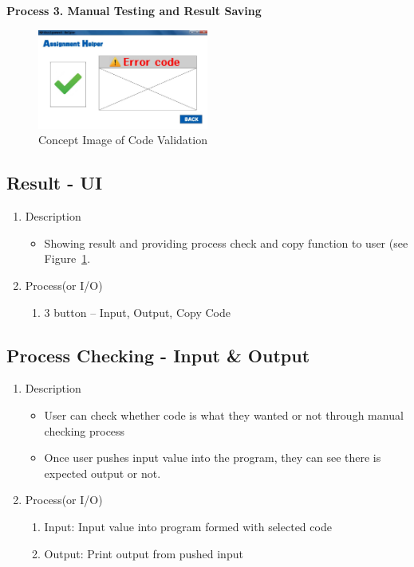 \documentclass[conference]{IEEEtran}
\begin{document}
\textbf{Process 3. Manual Testing and Result Saving}


\textit{}
\begin{figure}[h]
\centering
\includegraphics[width=0.5\textwidth]{./figures/UI_code_validation_fail.jpg}  
\caption{Concept Image of Code Validation}
\label{fig_concept_validation_manual}
\end{figure}


\subsection{Result - UI}
\begin{enumerate}
  \item Description
  \begin{itemize}
    \item Showing result and providing process check and copy function to user (see Figure~\ref{fig_concept_validation_manual}.
  \end{itemize}
  \item Process(or I/O)
  \begin{enumerate}
    \item 3 button – Input, Output, Copy Code
  \end{enumerate}
\end{enumerate}
\textit{}

\subsection{Process Checking - Input \& Output}
\begin{enumerate}
  \item Description
  \begin{itemize}
    \item User can check whether code is what they wanted or not through manual checking process
    \item Once user pushes input value into the program, they can see there is expected output or not.
  \end{itemize}
  \item Process(or I/O)
  \begin{enumerate}
    \item Input: Input value into program formed with selected code
    \item Output: Print output from pushed input
  \end{enumerate}
\end{enumerate}
\textit{}
\end{document}
